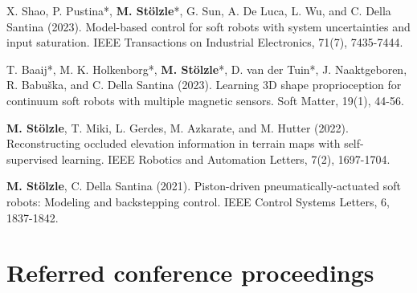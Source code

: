 \begin{enumerate}
{    \item \citep{shao2023model} X. Shao, P. Pustina*, \textbf{M. Stölzle}*, G. Sun, A. De Luca, L. Wu, and C. Della Santina (2023). Model-based control for soft robots with system uncertainties and input saturation. IEEE Transactions on Industrial Electronics, 71(7), 7435-7444.
    \item[\faFileTextO \, \stepcounter{enumi}\arabic{enumi}.] \citep{baaij2023learning} T. Baaij*, M. K. Holkenborg*, \textbf{M. Stölzle}*, D. van der Tuin*, J. Naaktgeboren, R. Babuška, and C. Della Santina (2023). Learning 3D shape proprioception for continuum soft robots with multiple magnetic sensors. Soft Matter, 19(1), 44-56.
    \item \citep{stolzle2022reconstructing} \textbf{M. Stölzle}, T. Miki, L. Gerdes, M. Azkarate, and M. Hutter (2022). Reconstructing occluded elevation information in terrain maps with self-supervised learning. IEEE Robotics and Automation Letters, 7(2), 1697-1704.
    \item[\faFileTextO \, \stepcounter{enumi}\arabic{enumi}.] \citep{stolzle2021piston} \textbf{M. Stölzle}, C. Della Santina (2021). Piston-driven pneumatically-actuated soft robots: Modeling and backstepping control. IEEE Control Systems Letters, 6, 1837-1842.
}\end{enumerate}


\section*{Referred conference proceedings}

